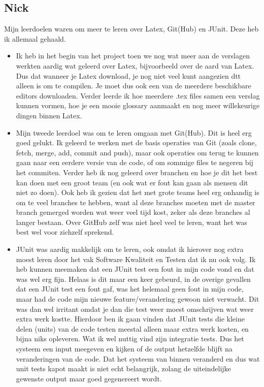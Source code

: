 \documentclass[a4paper]{article}
\begin{document}
\subsection*{Nick}
Mijn leerdoelen waren om meer te leren over Latex, Git(Hub) en JUnit. Deze heb ik allemaal gehaald.
\begin{itemize}
    \item Ik heb in het begin van het project toen we nog wat meer aan de verslagen werkten aardig wat geleerd over Latex, bijvoorbeeld over de aard van Latex. Dus dat wanneer je Latex download, je nog niet veel kunt aangezien dtt alleen is om te compilen. Je moet dus ook een van de meerdere beschikbare editors downloaden.
Verder leerde ik hoe meerdere .tex files samen een verslag kunnen vormen, hoe je een mooie glossary aanmaakt en nog meer willekeurige dingen binnen Latex.
    \item Mijn tweede leerdoel was om te leren omgaan met Git(Hub). Dit is heel erg goed gelukt. Ik geleerd te werken met de basis operaties van Git (zoals clone, fetch, merge, add, commit and push), maar ook operaties om terug te kunnen gaan naar een eerdere versie van de code, of om sommige files te negeren bij het commiten.
Verder heb ik nog geleerd over branchen en hoe je dit het best kan doen met een groot team (en ook wat er fout kan gaan als mensen dit niet zo doen).
Ook heb ik gezien dat het met grote teams heel erg onhandig is om te veel branches te hebben, want al deze branches moeten met de master branch gemerged worden wat weer veel tijd kost, zeker als deze branches al langer bestaan.
Over GitHub zelf was niet heel veel te leren, want het was best wel voor zichzelf sprekend.
    \item JUnit was aardig makkelijk om te leren, ook omdat ik hierover nog extra moest leren door het vak Software Kwaliteit en Testen dat ik nu ook volg. Ik heb kunnen meemaken dat een JUnit test een fout in mijn code vond en dat was wel erg fijn. Helaas is dit maar een keer gebeurd, in de overige gevallen dat een JUnit test een fout gaf, was het helemaal geen fout in mijn code, maar had de code mijn nieuwe feature/verandering gewoon niet verwacht. Dit was dan wel irritant omdat je dan die test weer moest omschrijven wat weer extra werk kostte.
Hierdoor ben ik gaan vinden dat JUnit tests die kleine delen (units) van de code testen meestal alleen maar extra werk kosten, en bijna niks opleveren. Wat ik wel nuttig vind zijn integratie tests. Dus het systeem een input meegeven en kijken of de output hetzelfde blijft na veranderingen van de code. Dat het systeem van binnen veranderd en dus wat unit tests kapot maakt is niet echt belangrijk, zolang de uiteindelijke gewenste output maar goed gegenereert wordt.
\end{itemize}
\end{document}

